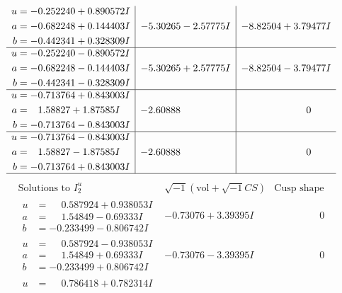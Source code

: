 \documentclass[1p]{elsarticle_modified}
\theoremstyle{definition}
\newcommand{\I}{\sqrt{-1}}
\begin{document}
$$\begin{array}{c|c|c}
\begin{aligned}
u &= -0.252240 + 0.890572 I \\
a &= -0.682248 + 0.144403 I \\
b &= -0.442341 + 0.328309 I\end{aligned}
 & -5.30265 - 2.57775 I & -8.82504 + 3.79477 I \\ \hline\begin{aligned}
u &= -0.252240 - 0.890572 I \\
a &= -0.682248 - 0.144403 I \\
b &= -0.442341 - 0.328309 I\end{aligned}
 & -5.30265 + 2.57775 I & -8.82504 - 3.79477 I \\ \hline\begin{aligned}
u &= -0.713764 + 0.843003 I \\
a &= \phantom{-}1.58827 + 1.87585 I \\
b &= -0.713764 - 0.843003 I\end{aligned}
 & -2.60888\phantom{ +0.000000I} & \phantom{-0.000000 } 0 \\ \hline\begin{aligned}
u &= -0.713764 - 0.843003 I \\
a &= \phantom{-}1.58827 - 1.87585 I \\
b &= -0.713764 + 0.843003 I\end{aligned}
 & -2.60888\phantom{ +0.000000I} & \phantom{-0.000000 } 0\\
 \hline 
 \end{array}$$\newpage$$\begin{array}{c|c|c}  
\text{Solutions to }I^u_{2}& \I (\text{vol} + \sqrt{-1}CS) & \text{Cusp shape}\\
 \hline 
\begin{aligned}
u &= \phantom{-}0.587924 + 0.938053 I \\
a &= \phantom{-}1.54849 - 0.69333 I \\
b &= -0.233499 - 0.806742 I\end{aligned}
 & -0.73076 + 3.39395 I & \phantom{-0.000000 } 0 \\ \hline\begin{aligned}
u &= \phantom{-}0.587924 - 0.938053 I \\
a &= \phantom{-}1.54849 + 0.69333 I \\
b &= -0.233499 + 0.806742 I\end{aligned}
 & -0.73076 - 3.39395 I & \phantom{-0.000000 } 0 \\ \hline\begin{aligned}
u &= \phantom{-}0.786418 + 0.782314 I \\

\end{aligned}
\end{array}$$
\end{document}
